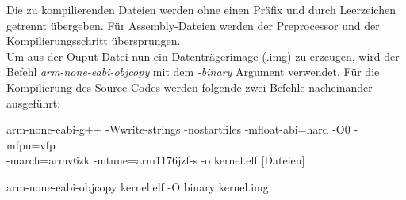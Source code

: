 \documentclass[12pt]{article}
\begin{document}
Die zu kompilierenden Dateien werden ohne einen Präfix und durch Leerzeichen getrennt übergeben. Für Assembly-Dateien werden der Preprocessor und der Kompilierungsschritt übersprungen.\\
Um aus der Ouput-Datei nun ein Datenträgerimage (.img) zu erzeugen, wird der Befehl \textit{arm-none-eabi-objcopy} mit dem \textit{-binary} Argument verwendet. Für die Kompilierung des Source-Codes werden folgende zwei Befehle nacheinander ausgeführt:\\
\begin{compactitem}
    \vspace{-5mm}
    \item arm-none-eabi-g++ -Wwrite-strings -nostartfiles -mfloat-abi=hard -O0 -mfpu=vfp\\
     -march=armv6zk -mtune=arm1176jzf-s -o kernel.elf [Dateien]
    \vspace{2mm}
    \item arm-none-eabi-objcopy kernel.elf -O binary kernel.img
\end{compactitem}
\end{document}
